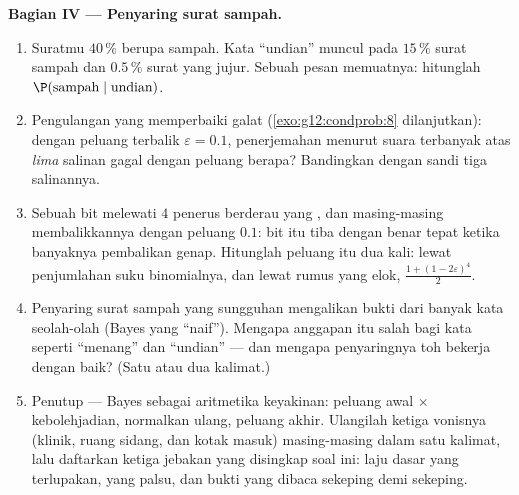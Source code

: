 \begin{problem}
\medskip
\noindent\textbf{Bagian IV --- Penyaring surat sampah.}
\begin{enumerate}[resume]
  \item Suratmu $40\,\%$ berupa sampah. Kata ``undian''
        muncul pada $15\,\%$ surat sampah dan $0.5\,\%$ surat
        yang jujur. Sebuah pesan memuatnya: hitunglah
        $\P(\text{sampah} \mid \text{undian})$.
  \item Pengulangan yang memperbaiki galat
        (\cref{exo:g12:condprob:8} dilanjutkan): dengan peluang
        terbalik $\varepsilon = 0.1$, penerjemahan menurut suara terbanyak atas
        \emph{lima} salinan gagal dengan peluang berapa?
        Bandingkan dengan sandi tiga salinannya.
  \item Sebuah bit melewati $4$ penerus berderau yang , dan masing-masing
        membalikkannya dengan peluang $0.1$: bit itu tiba dengan benar
        tepat ketika banyaknya pembalikan genap. Hitunglah peluang itu
        dua kali: lewat penjumlahan suku binomialnya, dan
        lewat rumus yang elok,
        $\frac{1 + (1 - 2\varepsilon)^4}{2}$.
  \item Penyaring surat sampah yang sungguhan mengalikan bukti dari banyak kata
        seolah-olah  (Bayes yang ``naif''). Mengapa anggapan
        itu salah bagi kata seperti ``menang'' dan
        ``undian'' --- dan mengapa penyaringnya toh bekerja dengan
        baik? (Satu atau dua kalimat.)
  \item Penutup --- Bayes sebagai aritmetika keyakinan: peluang awal
        $\times$ kebolehjadian, normalkan ulang, peluang akhir. Ulangilah
        ketiga vonisnya (klinik, ruang sidang, dan kotak masuk) masing-masing dalam satu
        kalimat, lalu daftarkan ketiga jebakan yang disingkap soal ini:
        laju dasar yang terlupakan,  yang palsu, dan
        bukti yang dibaca sekeping demi sekeping.

\end{enumerate}
\end{problem}
